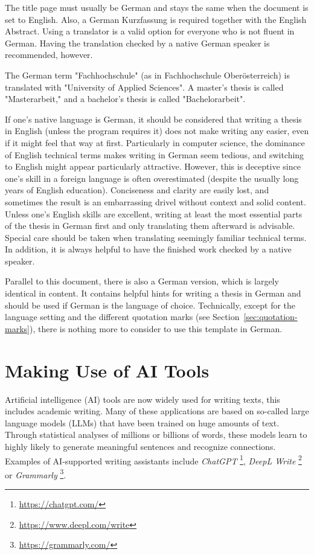 The title page must usually be German and stays the same when the document is
set to English. Also, a German Kurzfassung is required together with the English
Abstract. Using a translator is a valid option for everyone who is not fluent
in German. Having the translation checked by a native German speaker is
recommended, however.

The German term "Fachhochschule" (as in Fachhochschule Oberösterreich) is
translated with "University of Applied Sciences". A master's thesis is called
"Masterarbeit," and a bachelor's thesis is called "Bachelorarbeit".

If one's native language is German, it should be considered that writing a
thesis in English (unless the program requires it) does not make writing any
easier, even if it might feel that way at first. Particularly in computer
science, the dominance of English technical terms makes writing in German seem
tedious, and switching to English might appear particularly attractive. However,
this is deceptive since one's skill in a foreign language is often overestimated
(despite the usually long years of English education). Conciseness and clarity
are easily lost, and sometimes the result is an embarrassing drivel without
context and solid content. Unless one's English skills are excellent, writing at
least the most essential parts of the thesis in German first and only
translating them afterward is advisable. Special care should be taken when
translating seemingly familiar technical terms. In addition, it is always
helpful to have the finished work checked by a native speaker.

Parallel to this document, there is also a German version, which is largely
identical in content. It contains helpful hints for writing a thesis in German
and should be used if German is the language of choice. Technically, except for
the language setting and the different quotation marks (see
Section~\ref{sec:quotation-marks}), there is nothing more to consider to use
this template in German.


\section{Making Use of AI Tools}

Artificial intelligence (AI) tools are now widely used for writing texts, this
includes academic writing. Many of these applications are based on so-called
large language models (LLMs) that have been trained on huge amounts of text.
Through statistical analyses of millions or billions of words, these models
learn to highly likely to generate meaningful sentences and recognize
connections. Examples of AI-supported writing assistants include \emph{ChatGPT}%
\footnote{\url{https://chatgpt.com/}}, \emph{DeepL Write}%
\footnote{\url{https://www.deepl.com/write}} or \emph{Grammarly}%
\footnote{\url{https://grammarly.com/}}.

